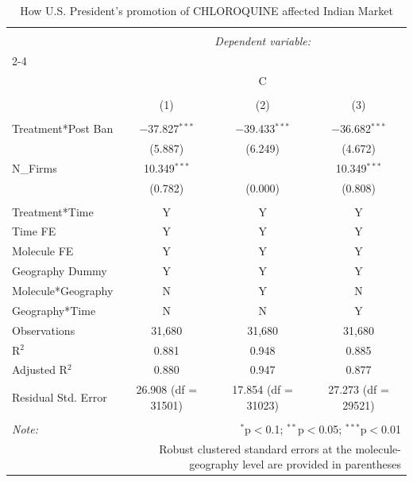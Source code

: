 \documentclass[12pt,english]{article}
\begin{document}
\begin{table}[H] \centering 
	\caption{How U.S. President's promotion of  CHLOROQUINE affected Indian Market} 
	\label{} 
	\footnotesize 
	\begin{tabular}{@{\extracolsep{1pt}}lccc} 
		\\[-1.8ex]\hline 
		\hline \\[-1.8ex] 
		& \multicolumn{3}{c}{\textit{Dependent variable:}} \\ 
		\cline{2-4} 
		\\[-1.8ex] & \multicolumn{3}{c}{C} \\ 
		\\[-1.8ex] & (1) & (2) & (3)\\ 
		\hline \\[-1.8ex] 
		Treatment*Post Ban & $-$37.827$^{***}$ & $-$39.433$^{***}$ & $-$36.682$^{***}$ \\ 
		& (5.887) & (6.249) & (4.672) \\ 
		N_Firms & 10.349$^{***}$ &  & 10.349$^{***}$ \\ 
		& (0.782) & (0.000) & (0.808) \\ 
		\hline \\[-1.8ex] 
		Treatment*Time & Y & Y & Y \\ 
		Time FE & Y & Y & Y \\ 
		Molecule FE & Y & Y & Y \\ 
		Geography Dummy & Y & Y & Y \\ 
		Molecule*Geography & N & Y & N \\ 
		Geography*Time & N & N & Y \\ 
		Observations & 31,680 & 31,680 & 31,680 \\ 
		R$^{2}$ & 0.881 & 0.948 & 0.885 \\ 
		Adjusted R$^{2}$ & 0.880 & 0.947 & 0.877 \\ 
		Residual Std. Error & 26.908 (df = 31501) & 17.854 (df = 31023) & 27.273 (df = 29521) \\ 
		\hline 
		\hline \\[-1.8ex] 
		\textit{Note:}  & \multicolumn{3}{r}{$^{*}$p$<$0.1; $^{**}$p$<$0.05; $^{***}$p$<$0.01} \\ 
		& \multicolumn{3}{r}{Robust clustered standard errors at the molecule-geography level are provided in parentheses} \\ 
	\end{tabular} 
\end{table} 
\end{document}

